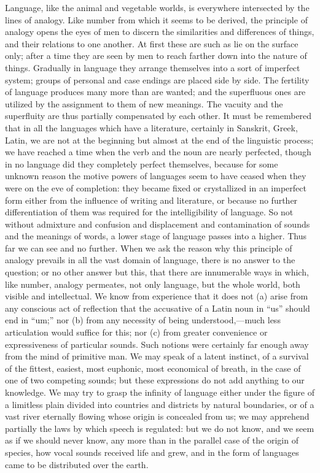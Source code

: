 \documentclass[11pt,letter]{article}
\begin{document}
\par  Language, like the animal and vegetable worlds, is everywhere intersected by the lines of analogy. Like number from which it seems to be derived, the principle of analogy opens the eyes of men to discern the similarities and differences of things, and their relations to one another. At first these are such as lie on the surface only; after a time they are seen by men to reach farther down into the nature of things. Gradually in language they arrange themselves into a sort of imperfect system; groups of personal and case endings are placed side by side. The fertility of language produces many more than are wanted; and the superfluous ones are utilized by the assignment to them of new meanings. The vacuity and the superfluity are thus partially compensated by each other. It must be remembered that in all the languages which have a literature, certainly in Sanskrit, Greek, Latin, we are not at the beginning but almost at the end of the linguistic process; we have reached a time when the verb and the noun are nearly perfected, though in no language did they completely perfect themselves, because for some unknown reason the motive powers of languages seem to have ceased when they were on the eve of completion: they became fixed or crystallized in an imperfect form either from the influence of writing and literature, or because no further differentiation of them was required for the intelligibility of language. So not without admixture and confusion and displacement and contamination of sounds and the meanings of words, a lower stage of language passes into a higher. Thus far we can see and no further. When we ask the reason why this principle of analogy prevails in all the vast domain of language, there is no answer to the question; or no other answer but this, that there are innumerable ways in which, like number, analogy permeates, not only language, but the whole world, both visible and intellectual. We know from experience that it does not (a) arise from any conscious act of reflection that the accusative of a Latin noun in “us” should end in “um;” nor (b) from any necessity of being understood,—much less articulation would suffice for this; nor (c) from greater convenience or expressiveness of particular sounds. Such notions were certainly far enough away from the mind of primitive man. We may speak of a latent instinct, of a survival of the fittest, easiest, most euphonic, most economical of breath, in the case of one of two competing sounds; but these expressions do not add anything to our knowledge. We may try to grasp the infinity of language either under the figure of a limitless plain divided into countries and districts by natural boundaries, or of a vast river eternally flowing whose origin is concealed from us; we may apprehend partially the laws by which speech is regulated: but we do not know, and we seem as if we should never know, any more than in the parallel case of the origin of species, how vocal sounds received life and grew, and in the form of languages came to be distributed over the earth.
\end{document}
